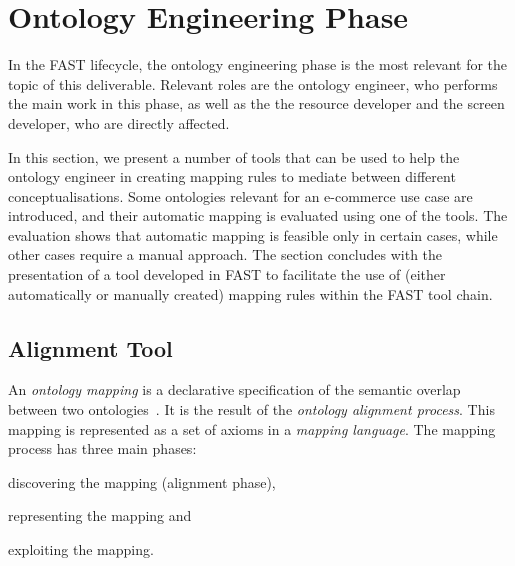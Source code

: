 \section{Ontology Engineering Phase}
\label{sec:ontologyengineering}

In the FAST lifecycle, the ontology engineering phase is the most relevant for the topic of this deliverable. Relevant roles are the ontology engineer, who performs the main work in this phase, as well as the the resource developer and the screen developer, who are directly affected.

In this section, we present a number of tools that can be used to help the ontology engineer in creating mapping rules to mediate between different conceptualisations. Some ontologies relevant for an e-commerce use case are introduced, and their automatic mapping is evaluated using one of the tools. The evaluation shows that automatic mapping is feasible only in certain cases, while other cases require a manual approach. The section concludes with the presentation of a tool developed in FAST to facilitate the use of (either automatically or manually created) mapping rules within the FAST tool chain.

\subsection{Alignment Tool}
\label{alignmenttool}

An \emph{ontology mapping} is a declarative specification of the semantic overlap between two ontologies~\cite{debruin2005wsml}. It is the result of the \emph{ontology alignment process}. This mapping is represented as a set of axioms in a \emph{mapping language}. The mapping process has three main phases:
\begin{inparaenum}[(1)]
    \item discovering the mapping (alignment phase), 
    \item representing the mapping and 
    \item exploiting the mapping.
\end{inparaenum}  


